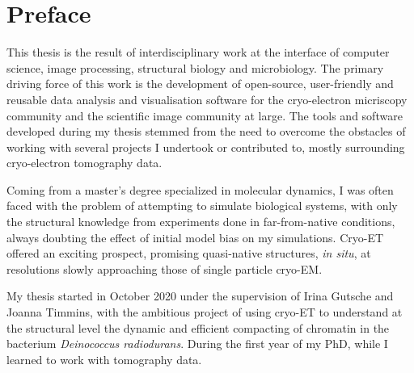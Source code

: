 \chapter{Preface}

This thesis is the result of interdisciplinary work at the interface of computer science, image processing, structural biology and microbiology.
The primary driving force of this work is the development of open-source, user-friendly and reusable data analysis and visualisation software for the cryo-electron micriscopy community and the scientific image community at large.
The tools and software developed during my thesis stemmed from the need to overcome the obstacles of working with several projects I undertook or contributed to, mostly surrounding cryo-electron tomography data.

Coming from a master's degree specialized in molecular dynamics, I was often faced with the problem of attempting to simulate biological systems, with only the structural knowledge from experiments done in far-from-native conditions, always doubting the effect of initial model bias on my simulations.
Cryo-ET offered an exciting prospect, promising quasi-native structures, \textit{in situ}, at resolutions slowly approaching those of single particle cryo-EM.

My thesis started in October 2020 under the supervision of Irina Gutsche and Joanna Timmins, with the ambitious project of using cryo-ET to understand at the structural level the dynamic and efficient compacting of chromatin in the bacterium \textit{Deinococcus radiodurans}.
During the first year of my PhD, while I learned to work with tomography data.

